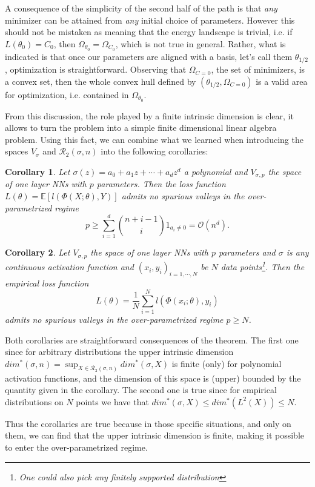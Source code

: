 \documentclass[11pt]{article} %
\newtheorem{corollary}{Corollary}[section]
\begin{document}
\par
A consequence of the simplicity of the second half of the path is that \emph{any} minimizer can be attained from \emph{any} initial choice of parameters. However this should not be mistaken as meaning that the energy landscape is trivial, i.e. if $L(\theta_0)=C_0$, then $\Omega_{\theta_0} = \Omega_{C_0}$, which is not true in general.
Rather, what is indicated is that once our parameters are aligned with a basis, let's call them $\theta_{1/2}$, optimization is straightforward. Observing that $\Omega_{C=0}$, the set of minimizers, is a convex set, then the whole convex hull defined by $(\theta_{1/2}, \Omega_{C=0})$ is a valid area for optimization, i.e. contained in $\Omega_{\theta_0}$.
\par
From this discussion, the role played by a finite intrinsic dimension is clear, it allows to turn the problem into a simple finite dimensional linear algebra problem. Using this fact, we can combine what we learned when introducing the spaces $V_\sigma$ and $\mathcal{R}_2(\sigma, n)$ into the following corollaries:
\begin{corollary}\label{th:polOpt}
	Let $\sigma(z) = a_0 + a_1 z + \cdots + a_dz^d$ a polynomial and $V_{\sigma, p}$ the space of one layer NNs with $p$ parameters. Then the loss function $L(\theta) = \mathbb{E}[l(\Phi(X;\theta), Y)]$ admits no spurious valleys in the over-parametrized regime
\begin{equation}
	p \geq \sum_{i=1}^d \binom{n+i-1}{i}1_{a_i\neq 0} = \mathcal{O}(n^d).
\end{equation}
\end{corollary}
\begin{corollary}
	Let $V_{\sigma, p}$ the space of one layer NNs with $p$ parameters and $\sigma$ is any continuous activation function and $(x_i, y_i)_{i=1,\cdots, N}$ be $N$ data points\footnote{One could also pick any finitely supported distribution}. Then the empirical loss function 
\begin{equation}
	L(\theta) = \frac{1}{N}\sum_{i=1}^Nl(\Phi(x_i;\theta), y_i)
\end{equation}
 admits no spurious valleys in the over-parametrized regime $p\geq N$.
\end{corollary}
Both corollaries are straightforward consequences of the theorem. The first one since for arbitrary distributions	the upper intrinsic dimension $dim^*(\sigma, n) = \sup_{X\in \mathcal{R}_2(\sigma, n)} dim^*(\sigma, X)$ is finite (only) for polynomial activation functions, and the dimension of this space is (upper) bounded by the quantity given in the corollary.
The second one is true since for empirical distributions on $N$ points we have that $dim^*(\sigma, X) \leq dim^*(L^2(X)) \leq N$.
\par
Thus the corollaries are true because in those specific situations, and only on them, we can find that the upper intrinsic dimension is finite, making it possible to enter the over-parametrized regime.
\end{document}
